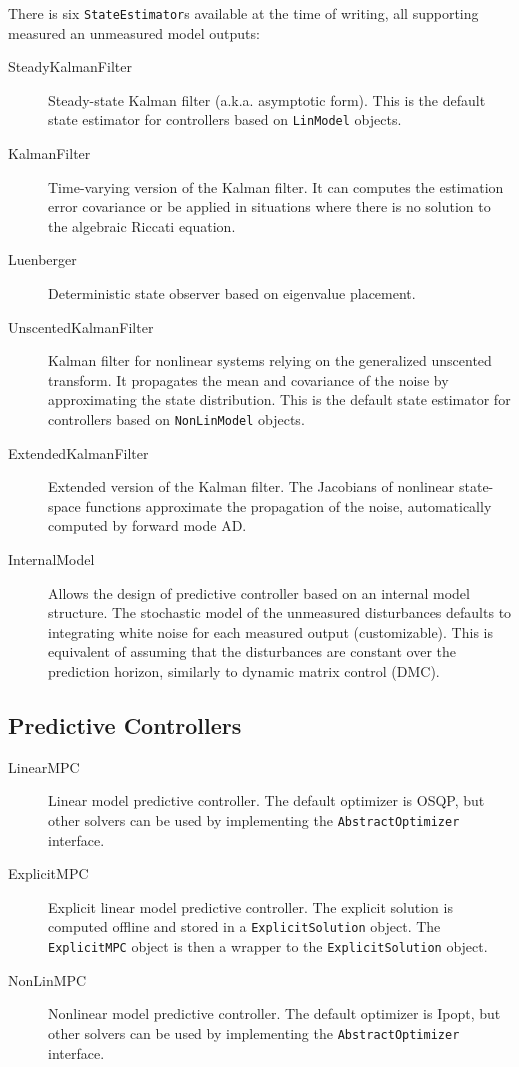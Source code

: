 There is six \texttt{StateEstimator}s available at the time of writing, all supporting measured an unmeasured model outputs:
\begin{description}
    \item[SteadyKalmanFilter] Steady-state Kalman filter (a.k.a. asymptotic form). This is the default state estimator for controllers based on \texttt{LinModel} objects.
    \item[KalmanFilter] Time-varying version of the Kalman filter. It can computes the estimation error covariance or be applied in situations where there is no solution to the algebraic Riccati equation.
    \item[Luenberger] Deterministic state observer based on eigenvalue placement.
    \item[UnscentedKalmanFilter] Kalman filter for nonlinear systems relying on the generalized unscented transform. It propagates the mean and covariance of the noise by approximating the state distribution. This is the default state estimator for controllers based on \texttt{NonLinModel} objects.
    \item[ExtendedKalmanFilter] Extended version of the Kalman filter. The Jacobians of nonlinear state-space functions approximate the propagation of the noise, automatically computed by forward mode AD.
    \item[InternalModel] Allows the design of predictive controller based on an internal model structure. The stochastic model of the unmeasured disturbances defaults to integrating white noise for each measured output (customizable). This is equivalent of assuming that the disturbances are constant over the prediction horizon, similarly to dynamic matrix control (DMC).
\end{description}

\subsection{Predictive Controllers}

\begin{description}
    \item[LinearMPC] Linear model predictive controller. The default optimizer is OSQP, but other solvers can be used by implementing the \texttt{AbstractOptimizer} interface.
    \item[ExplicitMPC] Explicit linear model predictive controller. The explicit solution is computed offline and stored in a \texttt{ExplicitSolution} object. The \texttt{ExplicitMPC} object is then a wrapper to the \texttt{ExplicitSolution} object.
    \item[NonLinMPC] Nonlinear model predictive controller. The default optimizer is Ipopt, but other solvers can be used by implementing the \texttt{AbstractOptimizer} interface. 
\end{description}


